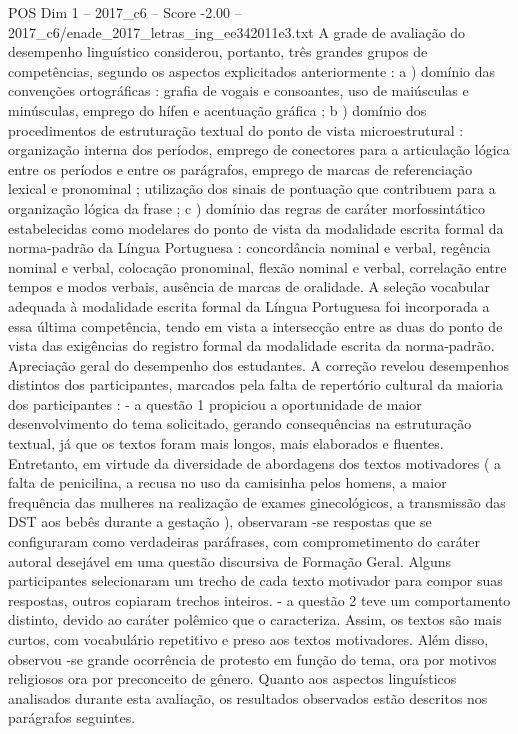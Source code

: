 \begin{textsample}{POS Dim 1 – 2017\_c6 – Score -2.00 – 2017\_c6/enade\_2017\_letras\_ing\_ee342011e3.txt}
A grade de avaliação do desempenho linguístico considerou, portanto, três grandes grupos de competências, segundo os aspectos explicitados anteriormente : a ) domínio das convenções ortográficas : grafia de vogais e consoantes, uso de maiúsculas e minúsculas, emprego do hífen e acentuação gráfica ; b ) domínio dos procedimentos de estruturação textual do ponto de vista microestrutural : organização interna dos períodos, emprego de conectores para a articulação lógica entre os períodos e entre os parágrafos, emprego de marcas de referenciação lexical e pronominal ; utilização dos sinais de pontuação que contribuem para a organização lógica da frase ; c ) domínio das regras de caráter morfossintático estabelecidas como modelares do ponto de vista da modalidade escrita formal da norma-padrão da Língua Portuguesa : concordância nominal e verbal, regência nominal e verbal, colocação pronominal, flexão nominal e verbal, correlação entre tempos e modos verbais, ausência de marcas de oralidade.
A seleção vocabular adequada à modalidade escrita formal da Língua Portuguesa foi incorporada a essa última competência, tendo em vista a intersecção entre as duas do ponto de vista das exigências do registro formal da modalidade escrita da norma-padrão.
Apreciação geral do desempenho dos estudantes.
A correção revelou desempenhos distintos dos participantes, marcados pela falta de repertório cultural da maioria dos participantes : - a questão 1 propiciou a oportunidade de maior desenvolvimento do tema solicitado, gerando consequências na estruturação textual, já que os textos foram mais longos, mais elaborados e fluentes.
Entretanto, em virtude da diversidade de abordagens dos textos motivadores ( a falta de penicilina, a recusa no uso da camisinha pelos homens, a maior frequência das mulheres na realização de exames ginecológicos, a transmissão das DST aos bebês durante a gestação ), observaram -se respostas que se configuraram como verdadeiras paráfrases, com comprometimento do caráter autoral desejável em uma questão discursiva de Formação Geral.
Alguns participantes selecionaram um trecho de cada texto motivador para compor suas respostas, outros copiaram trechos inteiros. - a questão 2 teve um comportamento distinto, devido ao caráter polêmico que o caracteriza.
Assim, os textos são mais curtos, com vocabulário repetitivo e preso aos textos motivadores.
Além disso, observou -se grande ocorrência de protesto em função do tema, ora por motivos religiosos ora por preconceito de gênero.
Quanto aos aspectos linguísticos analisados durante esta avaliação, os resultados observados estão descritos nos parágrafos seguintes.

\end{textsample}
